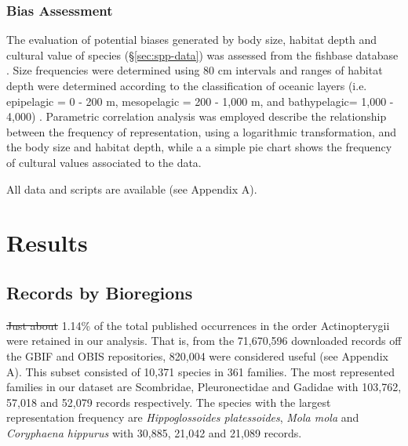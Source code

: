 \documentclass[12pt,authoryear]{elsarticle}
\providecommand{\DIFaddtex}[1]{{\protect\color{blue}\uwave{#1}}} %
\providecommand{\DIFdeltex}[1]{{\protect\color{red}\sout{#1}}}                      %
\providecommand{\DIFaddbegin}{} %
\providecommand{\DIFaddend}{} %
\providecommand{\DIFdelbegin}{} %
\providecommand{\DIFdelend}{} %
\providecommand{\DIFadd}[1]{\texorpdfstring{\DIFaddtex{#1}}{#1}} %
\providecommand{\DIFdel}[1]{\texorpdfstring{\DIFdeltex{#1}}{}} %
\begin{document}
\subsubsection{Bias Assessment}
\label{sec:bias-assessment}
The evaluation of potential biases generated by body size, habitat depth and cultural value of species (\S \ref{sec:spp-data}) was assessed from the fishbase database \citep{froese2021fishbase}. Size frequencies were determined using 80 cm intervals and ranges of habitat depth were determined according to the classification of oceanic layers (i.e. epipelagic = 0 - 200 m, mesopelagic = 200 - 1,000 m, and bathypelagic= 1,000 - 4,000) \citep{costello2010}. Parametric correlation analysis was employed describe the relationship between the frequency of representation, using a logarithmic transformation, and the body size and habitat depth, while a a simple pie chart shows the frequency of cultural values associated to the data.

All data and scripts are available (see Appendix A).


 \section{Results}

\subsection{Records by Bioregions}
\label{sec:cleaned-data}

\DIFdelbegin \DIFdel{Just about }\DIFdelend \DIFaddbegin \DIFadd{Approximately }\DIFaddend 1.14\% of the total published occurrences in the order Actinopterygii were retained in our analysis. That is, from the 71,670,596 downloaded records off the GBIF and OBIS repositories, 820,004 were considered useful (see Appendix A). This subset consisted of 10,371 species in 361 families. The most represented families in our dataset are Scombridae, Pleuronectidae and Gadidae with 103,762, 57,018 and 52,079 records respectively. The species with the largest representation frequency are \textit{Hippoglossoides platessoides}, \textit{Mola mola} and \textit{Coryphaena hippurus} with 30,885, 21,042 and 21,089 records. 
\end{document}
